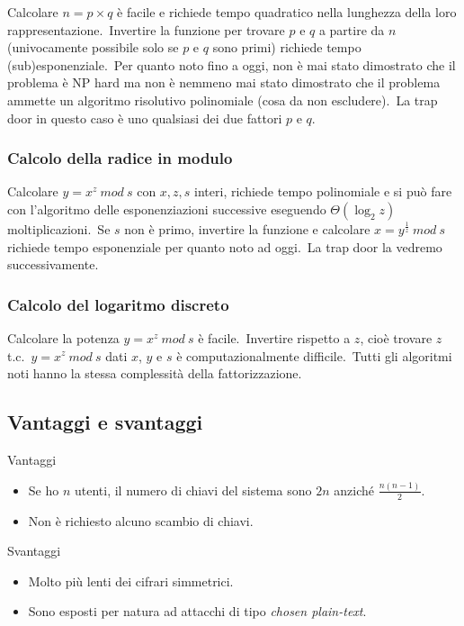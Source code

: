 Calcolare $n = p \times q$ è facile e richiede tempo quadratico nella lunghezza della loro rappresentazione.\
Invertire la funzione per trovare $p$ e $q$ a partire da $n$ (univocamente possibile solo se $p$ e $q$ sono primi) richiede tempo (sub)esponenziale.\
Per quanto noto fino a oggi, non è mai stato dimostrato che il problema è NP hard ma non è nemmeno mai stato dimostrato che il problema ammette un algoritmo risolutivo polinomiale (cosa da non escludere).\
La trap door in questo caso è uno qualsiasi dei due fattori $p$ e $q$.\

\subsubsection{Calcolo della radice in modulo}

Calcolare $y = x^z\ \mathit{mod}\ s$ con $x, z, s$ interi, richiede tempo polinomiale e si può fare con l'algoritmo delle esponenziazioni successive eseguendo $\Theta(\log_2 z)$ moltiplicazioni.\
Se $s$ non è primo, invertire la funzione e calcolare $x = y^{\frac{1}{z}}\ \mathit{mod}\ s$ richiede tempo esponenziale per quanto noto ad oggi.\
La trap door la vedremo successivamente.\

\subsubsection{Calcolo del logaritmo discreto}

Calcolare la potenza $y = x^z\ \mathit{mod}\ s$ è facile.\
Invertire rispetto a $z$, cioè trovare $z$ t.c.\ $y = x^z\ \mathit{mod}\ s$ dati $x$, $y$ e $s$ è computazionalmente difficile.\
Tutti gli algoritmi noti hanno la stessa complessità della fattorizzazione.\

\subsection{Vantaggi e svantaggi}

Vantaggi
\begin{itemize}
    \item Se ho $n$ utenti, il numero di chiavi del sistema sono $2n$ anziché $\frac{n(n - 1)}{2}$.
    \item Non è richiesto alcuno scambio di chiavi.
\end{itemize}
Svantaggi
\begin{itemize}
    \item Molto più lenti dei cifrari simmetrici.
    \item Sono esposti per natura ad attacchi di tipo \textit{chosen plain-text}.\
\end{itemize}

